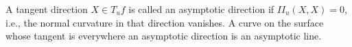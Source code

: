 A tangent direction $X \in T_u f$ is called an asymptotic direction if $II_u(X, X) = 0$, i.e., the normal curvature in that direction vanishes. A curve on the surface whose tangent is everywhere an asymptotic direction is an asymptotic line.